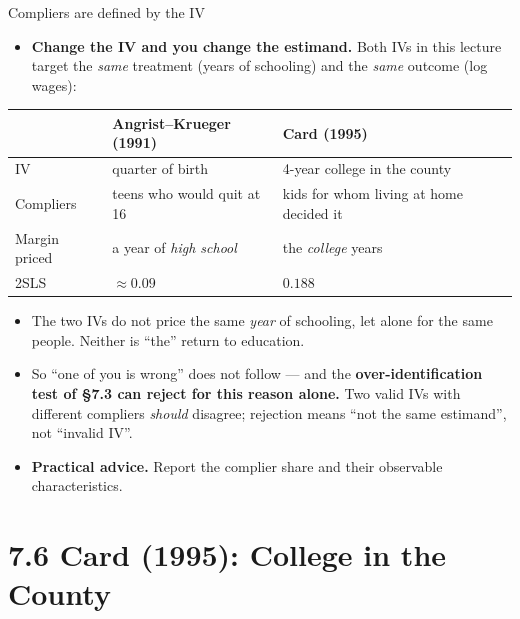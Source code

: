 \documentclass[
  11pt,
  ignorenonframetext,
  aspectratio=169,
]{beamer}
\providecommand{\tightlist}{%
  \setlength{\itemsep}{0pt}\setlength{\parskip}{0pt}}
\begin{document}
\begin{frame}{Compliers are defined by the IV}
\protect{}\label{compliers-are-defined-by-the-iv}
\small

\begin{itemize}
\tightlist
\item
  \textbf{Change the IV and you change the estimand.} Both IVs in this
  lecture target the \emph{same} treatment (years of schooling) and the
  \emph{same} outcome (log wages):
\end{itemize}

\begin{center}
\small
\begin{tabular}{lll}
\toprule
 & Angrist--Krueger (1991) & Card (1995) \\
\midrule
IV            & quarter of birth              & 4-year college in the county \\
Compliers     & teens who would quit at 16    & kids for whom living at home decided it \\
Margin priced & a year of \emph{high school}  & the \emph{college} years \\
2SLS          & $\approx 0.09$                & $0.188$ \\
\bottomrule
\end{tabular}
\end{center}

\begin{itemize}
\tightlist
\item
  The two IVs do not price the same \emph{year} of schooling, let alone
  for the same people. Neither is ``the'' return to education.
\item
  So ``one of you is wrong'' does not follow --- and the
  \textbf{over-identification test of §7.3 can reject for this reason
  alone.} Two valid IVs with different compliers \emph{should} disagree;
  rejection means ``not the same estimand'', not ``invalid IV''.
\item
  \textbf{Practical advice.} Report the complier share and their
  observable characteristics.
\end{itemize}
\end{frame}

\section{7.6 Card (1995): College in the
County}\label{card-1995-college-in-the-county}
\end{document}
